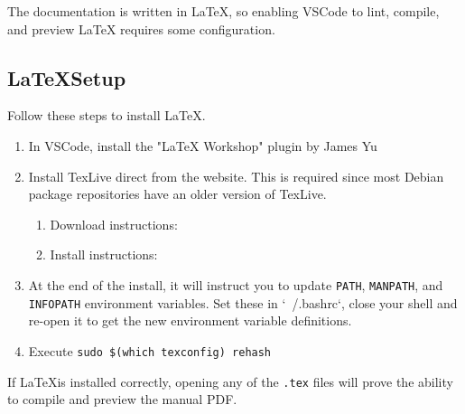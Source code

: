 The documentation is written in LaTeX, so enabling VSCode to lint, compile, and preview
LaTeX requires some configuration.

\subsection{\LaTeX\space Setup}

Follow these steps to install \LaTeX.

\begin{enumerate}
    \item In VSCode, install the "LaTeX Workshop" plugin by James Yu

    \item Install TexLive direct from the website.  This is required since
    most Debian package repositories have an older version of TexLive.
    \begin{enumerate}
        \item Download instructions: 
        \item Install instructions: 
    \end{enumerate}

    \item At the end of the install, it will instruct you to update \texttt{PATH}, \texttt{MANPATH}, and \texttt{INFOPATH}
    environment variables. Set these in `~/.bashrc`, close your shell and re-open it to get
    the new environment variable definitions.

    \item Execute \texttt{sudo \$(which texconfig) rehash}

\end{enumerate}

If \LaTeX\space is installed correctly, opening any of the \texttt{.tex} files will prove the ability to
compile and preview the manual PDF.
